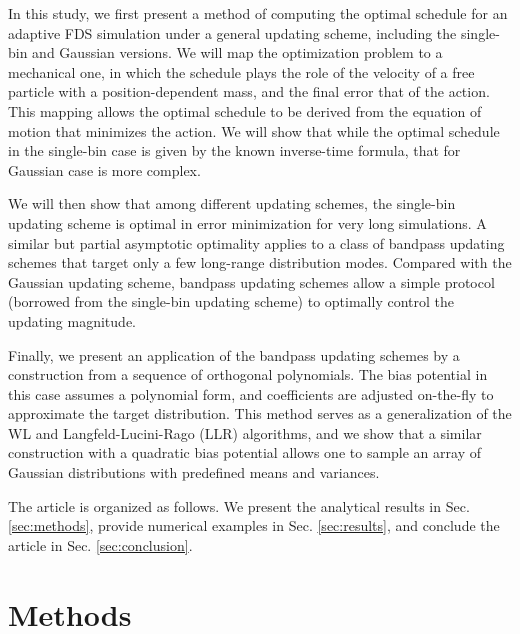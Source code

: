 \documentclass[preprint, superscriptaddress, floatfix]{revtex4-1}
\begin{document}
In this study,
we first present a method of computing
the optimal schedule
for an adaptive FDS simulation
under a general updating scheme,
including the single-bin and Gaussian versions.
%
We will map the optimization problem to a mechanical one,
in which the schedule plays the role of the velocity of
a free particle with a position-dependent mass,
and the final error that of the action.
%
This mapping allows the optimal schedule
to be derived from the equation of motion
that minimizes the action.
%
%
We will show that
while the optimal schedule in the single-bin case
is given by the known inverse-time formula,
that for Gaussian case is more complex.

We will then show that
among different updating schemes,
the single-bin updating scheme
is optimal in error minimization for very long simulations.
%
A similar but partial asymptotic optimality applies to
a class of bandpass updating schemes
that target only
a few long-range distribution modes.
%
Compared with the Gaussian updating scheme,
bandpass updating schemes allow
a simple protocol
(borrowed from the single-bin updating scheme)
to optimally control the updating magnitude.

Finally, we present an application of
the bandpass updating schemes
by a construction from
a sequence of orthogonal polynomials.
%
The bias potential in this case assumes
a polynomial form,
and coefficients are adjusted on-the-fly
to approximate the target distribution.
%
This method serves
as a generalization of the WL and Langfeld-Lucini-Rago (LLR)
algorithms\cite{langfeld2012, pellegrini2014},
and we show that
a similar construction with
a quadratic bias potential\cite{neuhaus2006, *neuhaus2007, zhu2012}
allows one to sample an array of Gaussian distributions
with predefined means and variances.

The article is organized as follows.
%
We present the analytical results in Sec. \ref{sec:methods},
provide numerical examples
in Sec. \ref{sec:results},
and conclude the article
in Sec. \ref{sec:conclusion}.




\section{\label{sec:methods}
Methods}
\end{document}
